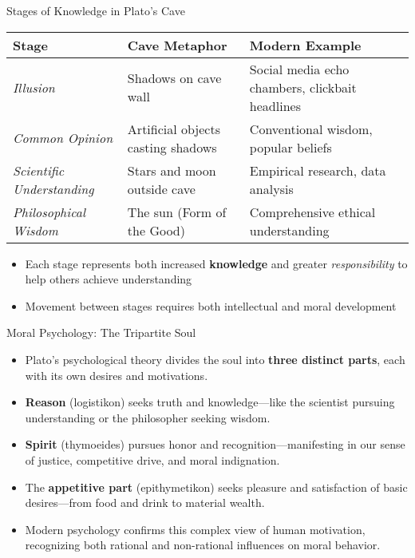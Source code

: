 \documentclass[aspectratio=169]{beamer}
\begin{document}
\begin{frame}{Stages of Knowledge in Plato's Cave}
\begin{center}
\begin{tabular}{|p{2.5cm}|p{4cm}|p{4cm}|}
\hline
\textbf{Stage} & \textbf{Cave Metaphor} & \textbf{Modern Example} \\
\hline
\emph{Illusion} & Shadows on cave wall & Social media echo chambers, clickbait headlines \\
\hline
\emph{Common Opinion} & Artificial objects casting shadows & Conventional wisdom, popular beliefs \\
\hline
\emph{Scientific Understanding} & Stars and moon outside cave & Empirical research, data analysis \\
\hline
\emph{Philosophical Wisdom} & The sun (Form of the Good) & Comprehensive ethical understanding \\
\hline
\end{tabular}
\end{center}
\vspace{0.3cm}
\begin{itemize}
\item Each stage represents both increased \textbf{knowledge} and greater \emph{responsibility} to help others achieve understanding
\item Movement between stages requires both intellectual and moral development
\end{itemize}
\end{frame}
\begin{frame}{Moral Psychology: The Tripartite Soul}
\begin{itemize}
\item Plato's psychological theory divides the soul into \textbf{three distinct parts}, each with its own desires and motivations.
\item \textbf{Reason} (logistikon) seeks truth and knowledge—like the scientist pursuing understanding or the philosopher seeking wisdom.
\item \textbf{Spirit} (thymoeides) pursues honor and recognition—manifesting in our sense of justice, competitive drive, and moral indignation.
\item The \textbf{appetitive part} (epithymetikon) seeks pleasure and satisfaction of basic desires—from food and drink to material wealth.
\item Modern psychology confirms this complex view of human motivation, recognizing both rational and non-rational influences on moral behavior.
\end{itemize}
\end{frame}
\end{document}
